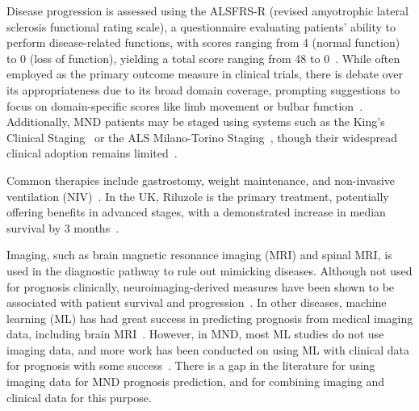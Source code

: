 Disease progression is assessed using the ALSFRS-R (revised amyotrophic lateral sclerosis functional rating scale), a questionnaire evaluating patients' ability to perform disease-related functions, with scores ranging from 4 (normal function) to 0 (loss of function), yielding a total score ranging from 48 to 0~\cite{cedarbaumALSFRSRRevisedALS1999}.
While often employed as the primary outcome measure in clinical trials, there is debate over its appropriateness due to its broad domain coverage, prompting suggestions to focus on domain-specific scores like limb movement or bulbar function~\cite{vaneijkOldFriendWho2021, rooneyWhatDoesALSFRSR2017}.
Additionally, MND patients may be staged using systems such as the King's Clinical Staging~\cite{rocheProposedStagingSystem2012} or the ALS Milano-Torino Staging~\cite{chioDevelopmentEvaluationClinical2015}, though their widespread clinical adoption remains limited~\cite{feldmanAmyotrophicLateralSclerosis2022, fangComparisonKingMiToS2017}.

Common therapies include gastrostomy, weight maintenance, and non-invasive ventilation (NIV)~\cite{bourkeEffectsNoninvasiveVentilation2006}.
In the UK, Riluzole is the primary treatment, potentially offering benefits in advanced stages, with a demonstrated increase in median survival by 3 months~\cite{millerRiluzoleAmyotrophicLateral2012, hinchcliffeRiluzoleRealworldEvidence2017}.


Imaging, such as brain magnetic resonance imaging (MRI) and spinal MRI, is used in the diagnostic pathway to rule out mimicking diseases.
Although not used for prognosis clinically, neuroimaging-derived measures have been shown to be associated with patient survival and progression~\cite{mullerLargescaleMulticentreCerebral2016,agostaMRIPredictorsLongterm2010}.
In other diseases, machine learning (ML) has had great success in predicting prognosis from medical imaging data, including brain MRI~\cite{gerratyMachineLearningParkinson2023}.
However, in MND, most ML studies do not use imaging data, and more work has been conducted on using ML with clinical data for prognosis with some success~\cite{grollemundMachineLearningAmyotrophic2019, papaizMachineLearningSolutions2022}.
There is a gap in the literature for using imaging data for MND prognosis prediction, and for combining imaging and clinical data for this purpose.

